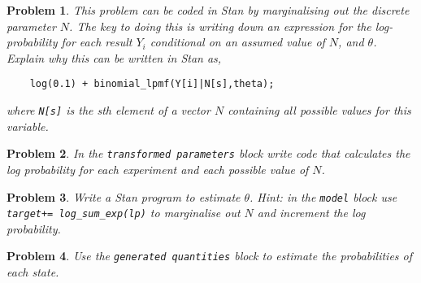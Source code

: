 \documentclass{article}
\newtheorem{problem}{Problem}[section]
\begin{document}
\begin{problem}
This problem can be coded in Stan by marginalising out the discrete parameter $N$. The key to doing this is writing down an expression for the log-probability for each result $Y_i$ conditional on an assumed value of $N$, and $\theta$. Explain why this can be written in Stan as,
	
	\begin{verbatim}
	log(0.1) + binomial_lpmf(Y[i]|N[s],theta);  
	\end{verbatim}
	
	where \texttt{N[s]} is the sth element of a vector $N$ containing all possible values for this variable.
	
\end{problem}


\begin{problem}
	In the \texttt{transformed parameters} block write code that calculates the log probability for each experiment and each possible value of $N$.
\end{problem}

\begin{problem}
Write a Stan program to estimate $\theta$. Hint: in the \texttt{model} block use \texttt{target+= log_sum_exp(lp)} to marginalise out $N$ and increment the log probability. 
\end{problem}

\begin{problem}
Use the \texttt{generated quantities} block to estimate the probabilities of each state.
\end{problem}


 

\end{document}
